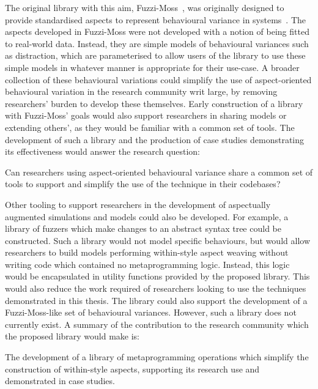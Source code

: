The original library with this aim, Fuzzi-Moss~\cite{fuzzimoss_repo}, was
originally designed to provide standardised aspects to represent behavioural
variance in \sociotechnical systems~\cite{wallis2018caise}. The aspects
developed in Fuzzi-Moss were not developed with a notion of being fitted to
real-world data. Instead, they are simple models of behavioural variances such
as distraction, which are parameterised to allow users of the library to use
these simple models in whatever manner is appropriate for their use-case. A
broader collection of these behavioural variations could simplify the use of
aspect-oriented behavioural variation in the research community writ large, by
removing researchers' burden to develop these themselves. Early construction of
a library with Fuzzi-Moss' goals would also support researchers in sharing
models or extending others', as they would be familiar with a common set of
tools. The development of such a library and the production of case studies
demonstrating its effectiveness would answer the research question:

\begin{researchquestion}
    Can researchers using aspect-oriented behavioural variance share a common
    set of tools to support and simplify the use of the technique in their
    codebases?
\end{researchquestion}

Other tooling to support researchers in the development of aspectually augmented
simulations and models could also be developed. For example, a library of
fuzzers which make changes to an abstract syntax tree could be constructed. Such
a library would not model specific behaviours, but would allow researchers to
build models performing within-style aspect weaving without writing code which
contained no metaprogramming logic. Instead, this logic would be encapsulated in
utility functions provided by the proposed library. This would also reduce the
work required of researchers looking to use the techniques demonstrated in this
thesis. The library could also support the development of a Fuzzi-Moss-like set
of \sociotechnical behavioural variances. However, such a library does not
currently exist. A summary of the contribution to the research community which
the proposed library would make is:

\begin{researchquestion}
    The development of a library of metaprogramming operations which simplify
    the construction of within-style aspects, supporting its research use and
    demonstrated in case studies.
\end{researchquestion}


